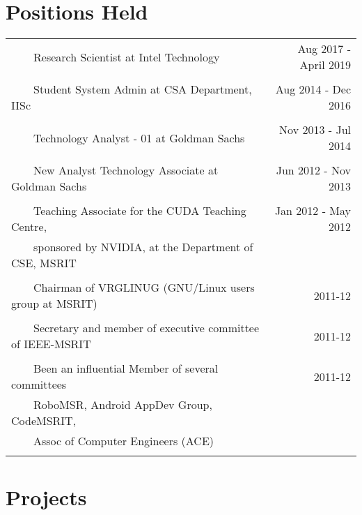 \documentclass[a4paper,10pt]{article} %
\newcommand{\tabitem}{~~\llap{\textbullet}~~}
\begin{document}
\section{Positions Held}

\begin{tabular}{lr}
\tabitem Research Scientist at Intel Technology & Aug 2017 - April 2019 \\
&\\
\tabitem Student System Admin at CSA Department, IISc & Aug 2014 - Dec 2016 \\
&\\
\tabitem Technology Analyst - 01 at Goldman Sachs & Nov 2013 - Jul 2014\\
&\\
\tabitem New Analyst Technology Associate at Goldman Sachs & Jun 2012 - Nov 2013\\
&\\
\tabitem Teaching Associate for the CUDA Teaching Centre,  & Jan 2012 - May 2012\\
~~~~sponsored by NVIDIA, at the Department of CSE, MSRIT &  \\
&\\
\tabitem Chairman of VRGLINUG (GNU/Linux users group at MSRIT) & 2011-12 \\
&\\
\tabitem Secretary and member of executive committee of IEEE-MSRIT & 2011-12 \\
&\\
\tabitem Been an influential Member of several committees & 2011-12 \\
~~~~RoboMSR, Android AppDev Group, CodeMSRIT, & \\
~~~~Assoc of Computer Engineers (ACE) & \\
&\\
\end{tabular}


\section{Projects}
\end{document}
